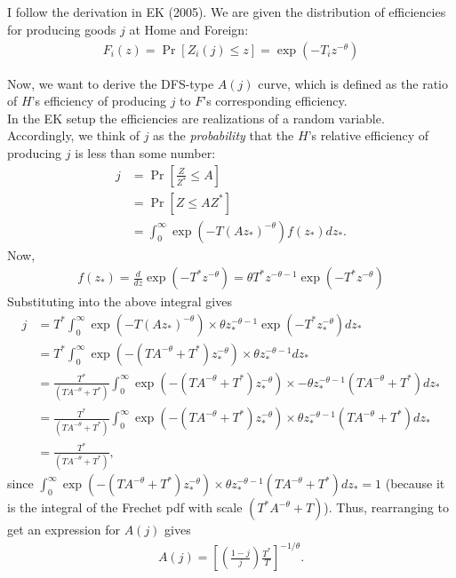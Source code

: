 \documentclass[12pt]{article}
\begin{document}
\subsection{}
I follow the derivation in EK (2005). We are given the distribution of efficiencies for producing goods $j$ at Home and Foreign:
\begin{align*}
F_i(z)=\Pr[Z_i(j) \leq z ] = \exp(-T_iz^{-\theta})
\end{align*}

\iffalse
Now, if we pick some random $j \in [0,1]$, the probability distribution of its efficiency, $Z_i(j)$, is obviously same as above. Accordingly, we can order goods such that
\begin{align*}
j &= \exp(-T_iz_i(j)^{-\theta})\\
\implies z_i(j) &= \left(-\frac{T_i}{\ln j}\right)^{-1/\theta}.
\end{align*}
(Essentially, think of the index $j$ as the vertical axis of the CDF above).\\
\fi


Now, we want to derive the DFS-type $A(j)$ curve, which is defined as the ratio of $H$'s efficiency of producing $j$ to $F$'s corresponding efficiency.\\

In the EK setup the efficiencies are realizations of a random variable. Accordingly, we think of $j$ as the \textit{probability} that the $H$'s relative efficiency of producing $j$ is less than some number:
\begin{align*}
j &= \Pr\left[\frac{Z}{Z^*} \leq A\right]\\
&=\Pr\left[Z \leq AZ^*\right]\\
&= \int_0^\infty \exp(-T(Az_*)^{-\theta}) f(z_*)dz_*.
\end{align*}
Now,
\begin{align*}
f(z_*) = \frac{d}{dz} \exp(-T^*z^{-\theta}) = \theta T^*z^{-\theta-1}\exp(-T^*z^{-\theta})
\end{align*}
Substituting into the above integral gives
\begin{align*}
j &= T^*\int_0^\infty \exp(-T(Az_*)^{-\theta}) \times \theta z_*^{-\theta-1}\exp(-T^*z_*^{-\theta})dz_*\\
&=T^*\int_0^\infty \exp(-(TA^{-\theta}+T^*)z_*^{-\theta}) \times\theta z_*^{-\theta-1}dz_*\\
&= \frac{T^*}{(TA^{-\theta}+T^*)} \int_0^\infty \exp(-(TA^{-\theta}+T^*)z_*^{-\theta}) \times -\theta z_*^{-\theta-1}(TA^{-\theta}+T^*)dz_*\\
&=\frac{T^*}{(TA^{-\theta}+T^*)} \int_0^\infty \exp(-(TA^{-\theta}+T^*)z_*^{-\theta}) \times \theta z_*^{-\theta-1}(TA^{-\theta}+T^*)dz_*\\
&=\frac{T^*}{(TA^{-\theta}+T^*)},
\end{align*}
since $ \int_0^\infty \exp(-(TA^{-\theta}+T^*)z_*^{-\theta}) \times \theta z_*^{-\theta-1}(TA^{-\theta}+T^*)dz_* = 1$ (because it is the integral of the Frechet pdf with scale $(T^*A^{-\theta}+T)$). Thus, rearranging to get an expression for $A(j)$ gives
\begin{align}
A(j) = \left[\left(\frac{1-j}{j}\right)\frac{T^*}{T}\right]^{-1/\theta}. \label{eq:EK0}
\end{align}
\end{document}
